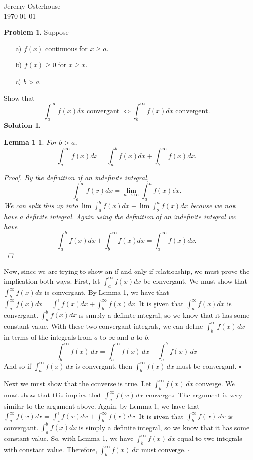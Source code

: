 \documentclass[12pt,letterpaper]{article}
\newtheorem*{lemma1}{Lemma 1}
\begin{document}
\begin{flushright}
\linespread{1}	%
\small \normalsize %
Jeremy Osterhouse \\
\today
\end{flushright}

{\bf Problem 1.} Suppose
\begin{enumerate}
\item[a)] $f(x)$ continuous for $x \geq a$.
\item[b)] $f(x) \geq 0$ for $x \geq x$.
\item[c)] $b>a$.
\end{enumerate}
Show that
\[
\int_a^\infty f(x) dx \mbox{ convergant } \iff \int_b^\infty f(x) dx \mbox{ convergent.}
\]
{\bf Solution 1.}
\begin{lemma1} For $b>a$,
\[
\int_a^\infty f(x) dx = \int_a^b f(x) dx + \int_b^\infty f(x) dx.
\]
\begin{proof}
By the definition of an indefinite integral,
\[
\int_a^\infty f(x) dx = \lim_{n \to \infty} \int_a^n f(x) dx.
\]
We can split this up into $\lim \int_a^b f(x)dx + \lim \int_b^n f(x)dx$ because we now have a definite integral. Again using the definition of an indefinite integral we have
\[
\int_a^b f(x)dx + \int_b^\infty f(x)dx = \int_a^\infty f(x) dx.
\]
\end{proof}
\end{lemma1}

Now, since we are trying to show an if and only if relationship, we must prove the implication both ways. First, let $\int_a^\infty f(x)dx$ be convergant. We must show that $\int_b^\infty f(x)dx$ is convergant. By Lemma 1, we have that $\int_a^\infty f(x) dx = \int_a^b f(x) dx + \int_b^\infty f(x) dx.$ It is given that $\int_a^\infty f(x)dx$ is convergant. $\int_a^b f(x)dx$ is simply a definite integral, so we know that it has some constant value. With these two convergant integrals, we can define $\int_b^\infty f(x)\,dx$ in terms of the integrals from $a$ to $\infty$ and $a$ to $b$.
\[
\int_b^\infty f(x)\,dx = \int_a^\infty f(x)\,dx - \int_a^b f(x)\,dx
\]
And so if $\int_a^\infty f(x)\,dx$ is convergant, then $\int_b^\infty f(x)\,dx$ must be convergant.
\hfill$\square$

Next we must show that the converse is true. Let $\int_b^\infty f(x)\,dx$ converge. We must show that this implies that $\int_a^\infty f(x)\,dx$ converges. The argument is very similar to the argument above. Again, by Lemma 1, we have that $\int_a^\infty f(x) dx = \int_a^b f(x) dx + \int_b^\infty f(x) dx$. It is given that $\int_b^\infty f(x)\,dx$ is convergant. $\int_a^b f(x)dx$ is simply a definite integral, so we know that it has some constant value. So, with Lemma 1, we have $\int_b^\infty f(x)\,dx$ equal to two integrals with constant value. Therefore, $\int_b^\infty f(x)\,dx$ must converge.
\hfill$\square$
\end{document}
